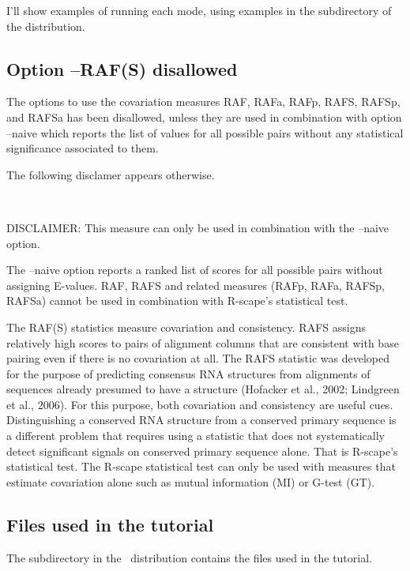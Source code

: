 I'll show examples of running each mode, using examples in the
 subdirectory of the distribution.

\subsection {Option --RAF(S) disallowed}

The options to use the covariation measures RAF, RAFa, RAFp, RAFS, RAFSp, and RAFSa has
been disallowed, unless they are used in combination with option
--naive which reports the list of values for all possible pairs
without any statistical significance associated to them.

The following disclamer appears otherwise.

\\

\begin{sreoutput}
DISCLAIMER: This measure can only be used in combination with the --naive option.

The --naive option reports a ranked list of scores for all possible
pairs without assigning E-values. RAF, RAFS and related measures
(RAFp, RAFa, RAFSp, RAFSa) cannot be used in combination with
R-scape's statistical test.

The RAF(S) statistics measure covariation and consistency. RAFS
assigns relatively high scores to pairs of alignment columns that are
consistent with base pairing even if there is no covariation at
all. The RAFS statistic was developed for the purpose of predicting
consensus RNA structures from alignments of sequences already presumed
to have a structure (Hofacker et al., 2002; Lindgreen et al.,
2006). For this purpose, both covariation and consistency are useful
cues. Distinguishing a conserved RNA structure from a conserved
primary sequence is a different problem that requires using a
statistic that does not systematically detect significant signals on
conserved primary sequence alone. That is R-scape's statistical
test. The R-scape statistical test can only be used with measures that
estimate covariation alone such as mutual information (MI) or G-test
(GT).
\end{sreoutput}

\subsection{Files used in the tutorial}

The subdirectory  in the \rscape\ distribution contains the
files used in the tutorial. 

